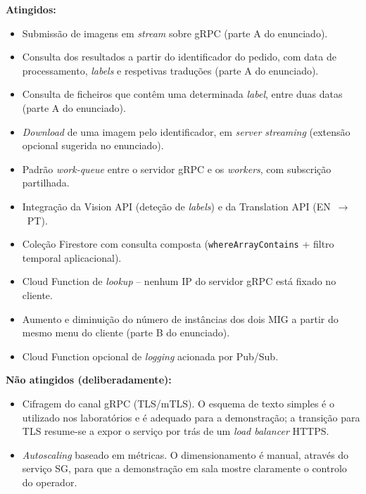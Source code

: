 \documentclass[11pt,a4paper]{article}
\begin{document}
\textbf{Atingidos:}
\begin{itemize}[leftmargin=1.4em,itemsep=2pt]
  \item Submiss\~ao de imagens em \emph{stream} sobre gRPC (parte A do
        enunciado).
  \item Consulta dos resultados a partir do identificador do pedido,
        com data de processamento, \emph{labels} e respetivas tradu\c{c}\~oes
        (parte A do enunciado).
  \item Consulta de ficheiros que cont\^em uma determinada \emph{label},
        entre duas datas (parte A do enunciado).
  \item \emph{Download} de uma imagem pelo identificador, em \emph{server
        streaming} (extens\~ao opcional sugerida no enunciado).
  \item Padr\~ao \emph{work-queue} entre o servidor gRPC e os
        \emph{workers}, com subscri\c{c}\~ao partilhada.
  \item Integra\c{c}\~ao da Vision API (dete\c{c}\~ao de \emph{labels}) e da
        Translation API (EN~$\rightarrow$~PT).
  \item Cole\c{c}\~ao Firestore com consulta composta
        (\texttt{whereArrayContains} + filtro temporal aplicacional).
  \item Cloud Function de \emph{lookup} -- nenhum IP do servidor gRPC
        est\'a fixado no cliente.
  \item Aumento e diminui\c{c}\~ao do n\'umero de inst\^ancias dos dois MIG a
        partir do mesmo menu do cliente (parte B do enunciado).
  \item Cloud Function opcional de \emph{logging} acionada por Pub/Sub.
\end{itemize}

\textbf{N\~ao atingidos (deliberadamente):}
\begin{itemize}[leftmargin=1.4em,itemsep=2pt]
  \item Cifragem do canal gRPC (TLS/mTLS). O esquema de texto simples
        \'e o utilizado nos laborat\'orios e \'e adequado para a
        demonstra\c{c}\~ao; a transi\c{c}\~ao para TLS resume-se a expor o
        servi\c{c}o por tr\'as de um \emph{load balancer} HTTPS.
  \item \emph{Autoscaling} baseado em m\'etricas. O dimensionamento \'e
        manual, atrav\'es do servi\c{c}o SG, para que a demonstra\c{c}\~ao em
        sala mostre claramente o controlo do operador.
\end{itemize}
\end{document}
